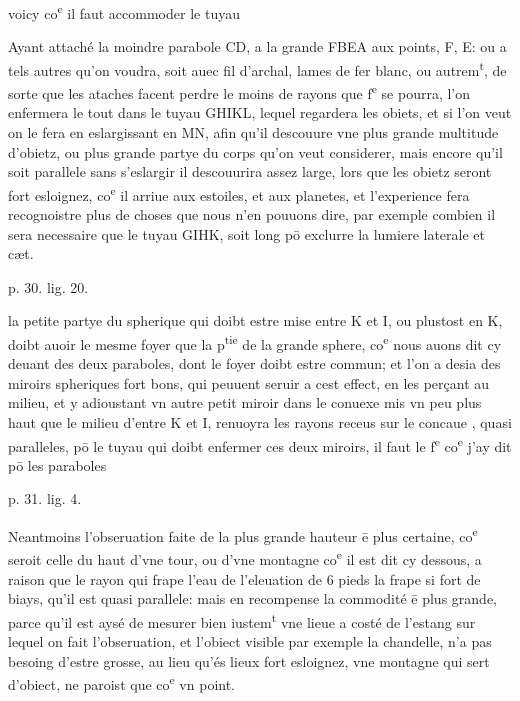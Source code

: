 \documentclass[11pt,a4paper]{article}
\begin{document}
voicy co\textsuperscript{e} il faut accommoder le tuyau

Ayant attaché la moindre parabole CD, a la grande FBEA aux points, F, E: ou a tels autres qu'on voudra, soit auec fil d'archal, lames de fer blanc, ou autrem\textsuperscript{t}, de sorte que les ataches facent perdre le moins de rayons que f\textsuperscript{e} se pourra, l'on enfermera le tout dans le tuyau GHIKL, lequel regardera les obiets, et si l'on veut on le fera en eslargissant en MN, afin qu'il descouure vne plus grande multitude d'obietz, ou plus grande partye du corps qu'on veut considerer, mais encore qu'il soit parallele sans s'eslargir il descouurira assez large, lors que les obietz seront fort esloignez, co\textsuperscript{e} il arriue aux estoiles, et aux planetes, et l'experience fera recognoistre plus de choses que nous n'en pouuons dire, par exemple combien il sera necessaire que le tuyau GIHK, soit long pō exclurre la lumiere laterale et cæt.

p. 30. lig. 20.

la petite partye du spherique qui doibt estre mise entre K et I, ou plustost en K, doibt auoir le mesme foyer que la p\textsuperscript{tie} de la grande sphere, co\textsuperscript{e} nous auons dit cy deuant des deux paraboles, dont le foyer doibt estre commun; et l'on a desia des miroirs spheriques fort bons, qui peuuent seruir a cest effect, en les perçant au milieu, et y adioustant vn autre petit miroir dans le conuexe mis vn peu plus haut que le milieu d'entre K et I, renuoyra les rayons receus sur le concaue , quasi paralleles, pō le tuyau qui doibt enfermer ces deux miroirs, il faut le f\textsuperscript{e} co\textsuperscript{e} j'ay dit pō les paraboles

p. 31. lig. 4.

Neantmoins l'obseruation faite de la plus grande hauteur ē plus certaine, co\textsuperscript{e} seroit celle du haut d'vne tour, ou d'vne montagne co\textsuperscript{e} il est dit cy dessous, a raison que le rayon qui frape l'eau de l'eleuation de 6 pieds la frape si fort de biays, qu'il est quasi parallele: mais en recompense la commodité ē plus grande, parce qu'il est aysé de mesurer bien iustem\textsuperscript{t} vne lieue a costé de l'estang sur lequel on fait l'obseruation, et l'obiect visible par exemple la chandelle, n'a pas besoing d'estre grosse, au lieu qu'és lieux fort esloignez, vne montagne qui sert d'obiect, ne paroist que co\textsuperscript{e} vn point.
\end{document}
